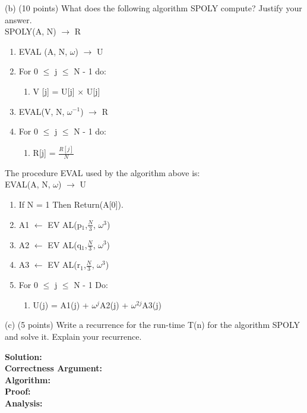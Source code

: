 \documentclass[11pt]{article}
\begin{document}
(b) (10 points) What does the following algorithm SPOLY compute? Justify your answer.\\
SPOLY(A, N) $\to$ R
\renewcommand{\labelenumi}{\roman{enumi}}
\begin{enumerate}
\item EVAL (A, N, $\omega$) $\to$ U
\item For 0 $\leq$ j $\leq$ N - 1 do:
	\begin{enumerate}
	\item V [j] = U[j] $\times$ U[j]
	\end{enumerate}
\item EVAL(V, N, $\omega$$^{-1}$) $\to$ R
\item For 0 $\leq$ j $\leq$ N - 1 do:
	\begin{enumerate}
	\item R[j] = $\frac{R[j]}{N}$
	\end{enumerate}
\end{enumerate}
The procedure EVAL used by the algorithm above is:\\
EVAL(A, N, $\omega$) $\to$ U
\renewcommand{\labelenumi}{\roman{enumi}}
\begin{enumerate}
\item If N = 1 Then Return(A[0]).
\item A1 $\gets$ EV AL(p$_1$,$\frac{N}{3}$, $\omega$$^3$)
\item A2 $\gets$ EV AL(q$_1$,$\frac{N}{3}$, $\omega$$^3$)
\item A3 $\gets$ EV AL(r$_1$,$\frac{N}{3}$, $\omega$$^3$)
\item For 0 $\leq$ j $\leq$ N - 1 Do:
	\begin{enumerate}
	\item U(j) = A1(j) + $\omega$$^j$A2(j) + $\omega$$^{2j}$A3(j)
	\end{enumerate}
\end{enumerate}
(c) (5 points) Write a recurrence for the run-time T(n) for the algorithm SPOLY and solve it.
Explain your recurrence.

\textbf{Solution:}\\
\textbf{Correctness Argument:}\\
\textbf{Algorithm:}\\
\textbf{Proof:}\\
\textbf{Analysis:}\\
\clearpage
\end{document}
